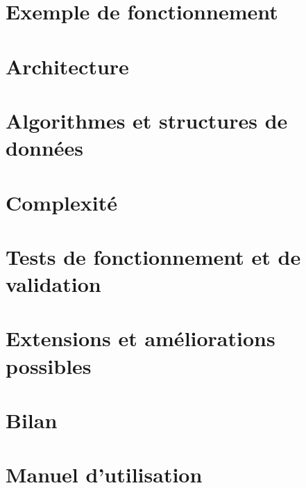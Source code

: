 \documentclass{article}
\begin{document}
\clearpage

\newpage

\section{Exemple de fonctionnement}



\section{Architecture}



\section{Algorithmes et structures de données}



\section{Complexité}



\section{Tests de fonctionnement et de validation}



\section{Extensions et améliorations possibles}



\section{Bilan}



\section{Manuel d'utilisation}



\newpage


\nocite{*}


 
\end{document}

